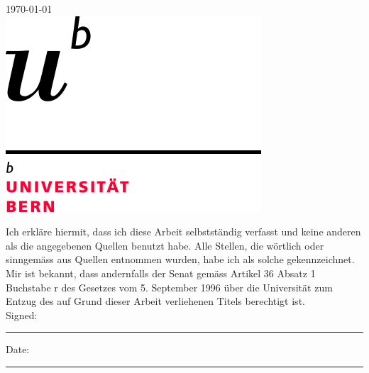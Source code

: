 \documentclass[
11pt, %
english, %
singlespacing, %
headsepline, %
]{MastersDoctoralThesis} %
\begin{document}
\begin{titlepage}
\begin{center}
{\large \today}\\[2cm] %
\includegraphics[scale=0.4]{Logo} %
 
\vfill
\end{center}
\end{titlepage}


\begin{declaration}
\addchaptertocentry{\authorshipname}

\noindent Ich erkläre hiermit, dass ich diese Arbeit selbstständig verfasst und keine anderen als die angegebenen Quellen benutzt habe. Alle Stellen, die wörtlich oder sinngemäss aus Quellen entnommen wurden, habe ich als solche gekennzeichnet. Mir ist bekannt, dass andernfalls der Senat gemäss Artikel 36 Absatz 1 Buchstabe r des Gesetzes vom 5. September 1996 über die Universität zum Entzug des auf Grund dieser Arbeit verliehenen Titels berechtigt ist.\\[2cm]


\noindent Signed:\\
\rule[0.5em]{25em}{0.5pt} %
 
\noindent Date:\\
\rule[0.5em]{25em}{0.5pt} %
\end{declaration}

\cleardoublepage

\end{document}
